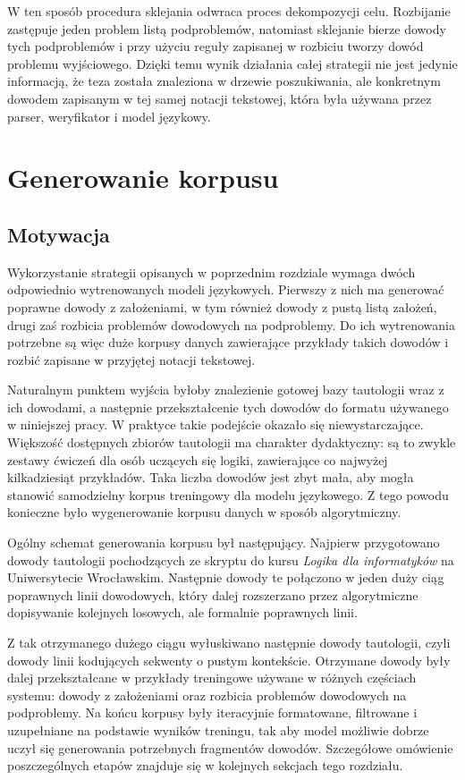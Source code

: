 \documentclass[shortabstract]{iithesis}
\theoremstyle{definition}
\theoremstyle{remark}
\theoremstyle{plain}
\begin{document}
W ten sposób procedura sklejania odwraca proces dekompozycji celu. Rozbijanie
zastępuje jeden problem listą podproblemów, natomiast sklejanie bierze dowody tych
podproblemów i przy użyciu reguły zapisanej w rozbiciu tworzy dowód problemu
wyjściowego. Dzięki temu wynik działania całej strategii nie jest jedynie informacją,
że teza została znaleziona w drzewie poszukiwania, ale konkretnym dowodem zapisanym
w tej samej notacji tekstowej, która była używana przez parser, weryfikator i model
językowy.

\chapter{Generowanie korpusu}

\section{Motywacja}

Wykorzystanie strategii opisanych w poprzednim rozdziale wymaga dwóch odpowiednio
wytrenowanych modeli językowych. Pierwszy z nich ma generować poprawne
dowody z założeniami, w tym również dowody z pustą listą założeń, drugi zaś
rozbicia problemów dowodowych na podproblemy. Do ich wytrenowania potrzebne są
więc duże korpusy danych zawierające przykłady takich dowodów i rozbić zapisane
w przyjętej notacji tekstowej.

Naturalnym punktem wyjścia byłoby znalezienie gotowej bazy tautologii wraz z ich
dowodami, a następnie przekształcenie tych dowodów do formatu używanego w
niniejszej pracy. W praktyce takie podejście okazało się niewystarczające. Większość
dostępnych zbiorów tautologii ma charakter dydaktyczny: są to zwykle zestawy
ćwiczeń dla osób uczących się logiki, zawierające co najwyżej kilkadziesiąt
przykładów. Taka liczba dowodów jest zbyt mała, aby mogła stanowić samodzielny
korpus treningowy dla modelu językowego. Z tego powodu konieczne było
wygenerowanie korpusu danych w sposób algorytmiczny.

Ogólny schemat generowania korpusu był następujący. Najpierw przygotowano
dowody tautologii pochodzących ze skryptu do kursu \emph{Logika dla informatyków}
na Uniwersytecie Wrocławskim. Następnie dowody te połączono w jeden duży ciąg
poprawnych linii dowodowych, który dalej rozszerzano przez algorytmiczne dopisywanie
kolejnych losowych, ale formalnie poprawnych linii.

Z tak otrzymanego dużego ciągu wyłuskiwano następnie dowody tautologii, czyli
dowody linii kodujących sekwenty o pustym kontekście. Otrzymane dowody były
dalej przekształcane w przykłady treningowe używane w różnych częściach systemu:
dowody z założeniami oraz rozbicia problemów dowodowych na podproblemy. Na
końcu korpusy były iteracyjnie formatowane, filtrowane i uzupełniane na podstawie
wyników treningu, tak aby model możliwie dobrze uczył się generowania potrzebnych
fragmentów dowodów. Szczegółowe omówienie poszczególnych etapów znajduje się w
kolejnych sekcjach tego rozdziału.
\end{document}
